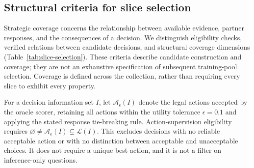\subsection{Structural criteria for slice selection}
\label{app:slice-selection}

Strategic coverage concerns the relationship between available evidence,
partner responses, and the consequences of a decision. We distinguish
eligibility checks, verified relations between candidate decisions, and
structural coverage dimensions (Table~\ref{tab:slice-selection}). These
criteria describe candidate construction and coverage; they are not an
exhaustive specification of subsequent training-pool selection. Coverage is
defined across the collection, rather than requiring every slice to exhibit
every property.

For a decision information set $I$, let $\mathcal A_\epsilon(I)$ denote the
legal actions accepted by the oracle scorer, retaining all actions within
the utility tolerance $\epsilon=0.1$ and applying the stated response
tie-breaking rule. Action-supervision eligibility requires
$\varnothing\neq\mathcal A_\epsilon(I)\subsetneq\mathcal L(I)$.
This excludes decisions with no reliable acceptable action or with no
distinction between acceptable and unacceptable choices. It does not require
a unique best action, and it is not a filter on inference-only questions.

